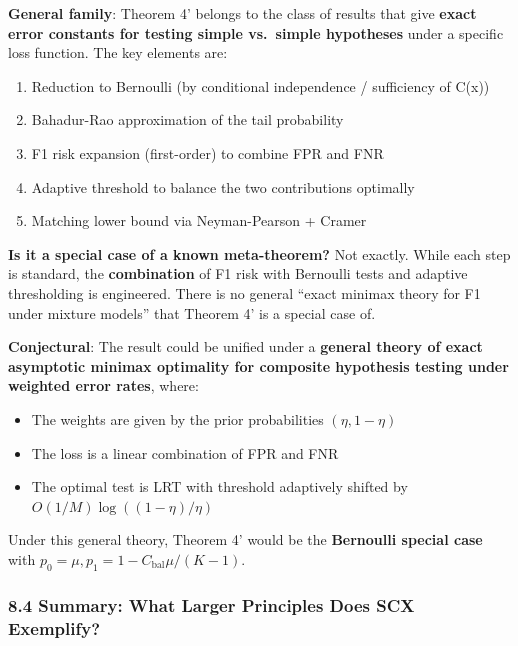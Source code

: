 \documentclass[
  12pt,
]{ctexart}
\providecommand{\tightlist}{%
  \setlength{\itemsep}{0pt}\setlength{\parskip}{0pt}}
\begin{document}
\textbf{General family}: Theorem 4' belongs to the class of results that
give \textbf{exact error constants for testing simple vs.~simple
hypotheses} under a specific loss function. The key elements are:

\begin{enumerate}
\def\labelenumi{\arabic{enumi}.}
\tightlist
\item
  Reduction to Bernoulli (by conditional independence / sufficiency of
  C(x))
\item
  Bahadur-Rao approximation of the tail probability
\item
  F1 risk expansion (first-order) to combine FPR and FNR
\item
  Adaptive threshold to balance the two contributions optimally
\item
  Matching lower bound via Neyman-Pearson + Cramer
\end{enumerate}

\textbf{Is it a special case of a known meta-theorem?} Not exactly.
While each step is standard, the \textbf{combination} of F1 risk with
Bernoulli tests and adaptive thresholding is engineered. There is no
general ``exact minimax theory for F1 under mixture models'' that
Theorem 4' is a special case of.

\textbf{Conjectural}: The result could be unified under a
\textbf{general theory of exact asymptotic minimax optimality for
composite hypothesis testing under weighted error rates}, where:

\begin{itemize}
\tightlist
\item
  The weights are given by the prior probabilities \((\eta, 1-\eta)\)
\item
  The loss is a linear combination of FPR and FNR
\item
  The optimal test is LRT with threshold adaptively shifted by
  \(O(1/M)\log((1-\eta)/\eta)\)
\end{itemize}

Under this general theory, Theorem 4' would be the \textbf{Bernoulli
special case} with \(p_0 = \mu, p_1 = 1 - C_{\text{bal}}\mu/(K-1)\).

\subsubsection{8.4 Summary: What Larger Principles Does SCX
Exemplify?}\label{summary-what-larger-principles-does-scx-exemplify}
\end{document}
